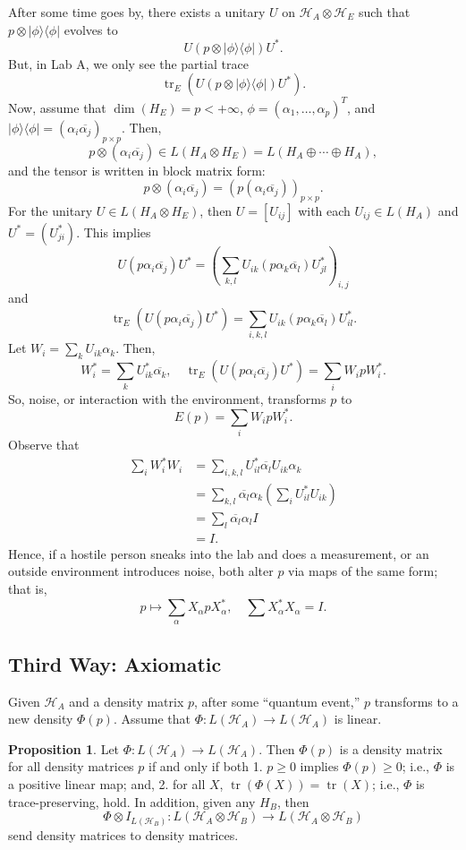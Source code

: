 \documentclass[12pt]{article}
\theoremstyle{definition}
\newtheorem*{proposition}{Proposition}
\newcommand{\ketbra}[2]{|#1\rangle\langle #2|}
\DeclareMathOperator{\tr}{tr}
\begin{document}
After some time goes by, there exists a unitary $U$ on $\mathcal{H}_A \otimes \mathcal{H}_E$ such that $p \otimes \ketbra{\phi}{\phi}$ evolves to
\[
U(p \otimes \ketbra{\phi}{\phi})U^*.
\]
But, in Lab A, we only see the partial trace
\[
\tr_E(U(p \otimes \ketbra{\phi}{\phi})U^*).
\]
Now, assume that $\dim(H_E)=p<+\infty$, $\phi=(\alpha_1,\ldots,\alpha_p)^T$, and $\ketbra{\phi}{\phi}=(\alpha_i\overline{\alpha_j})_{p\times p}$. Then,
\[
p \otimes (\alpha_i\overline{\alpha_j}) \in L(H_A \otimes H_E) = L(H_A \oplus \cdots \oplus H_A),
\]
and the tensor is written in block matrix form:
\[
p \otimes (\alpha_i\overline{\alpha_j}) = (p(\alpha_i\overline{\alpha_j}))_{p\times p}.
\]
For the unitary $U \in L(H_A \otimes H_E)$, then $U=[U_{ij}]$ with each $U_{ij} \in L(H_A)$ and $U^*=(U_{ji}^*)$. This implies
\[
U(p\alpha_i\overline{\alpha_j})U^* = \left(\sum_{k,l} U_{ik}(p\alpha_k\overline{\alpha_l})U_{jl}^*\right)_{i,j}
\]
and
\[
\tr_E(U(p\alpha_i\overline{\alpha_j})U^*) = \sum_{i,k,l} U_{ik}(p\alpha_k\overline{\alpha_l})U_{il}^*.
\]
Let $W_i = \sum_k U_{ik}\alpha_k$. Then,
\[
W_i^* = \sum_k U_{ik}^*\overline{\alpha_k}, \quad \tr_E(U(p\alpha_i\overline{\alpha_j})U^*) = \sum_i W_ipW_i^*.
\]
So, noise, or interaction with the environment, transforms $p$ to
\[
E(p) = \sum_i W_i pW_i^*.
\]
Observe that
\begin{align*}
\sum_i W_i^*W_i &= \sum_{i,k,l} U_{il}^*\overline{\alpha_l}U_{ik}\alpha_k \\
&= \sum_{k,l} \overline{\alpha_l}\alpha_k \left(\sum_i U_{il}^*U_{ik}\right) \\
&= \sum_l \overline{\alpha_l}\alpha_l I \\
&= I.
\end{align*}
Hence, if a hostile person sneaks into the lab and does a measurement, or an outside environment introduces noise, both alter $p$ via maps of the same form; that is,
\[
p \mapsto \sum_\alpha X_\alpha pX_\alpha^*, \quad \sum X_\alpha^*X_\alpha=I.
\]

\subsection{Third Way: Axiomatic}

Given $\mathcal{H}_A$ and a density matrix $p$, after some ``quantum event,'' $p$ transforms to a new density $\Phi(p)$. Assume that $\Phi:L(\mathcal{H}_A)\to L(\mathcal{H}_A)$ is linear.

\begin{proposition}
Let $\Phi:L(\mathcal{H}_A)\to L(\mathcal{H}_A)$. Then $\Phi(p)$ is a density matrix for all density matrices $p$ if and only if both
1. $p \geq 0$ implies $\Phi(p) \geq 0$; i.e., $\Phi$ is a positive linear map; and,
2. for all $X$, $\tr(\Phi(X))=\tr(X)$; i.e., $\Phi$ is trace-preserving,
hold. In addition, given any $H_B$, then
\[
\Phi \otimes I_{L(\mathcal{H}_B)} : L(\mathcal{H}_A \otimes \mathcal{H}_B) \to L(\mathcal{H}_A \otimes \mathcal{H}_B)
\]
send density matrices to density matrices.
\end{proposition}
\end{document}
